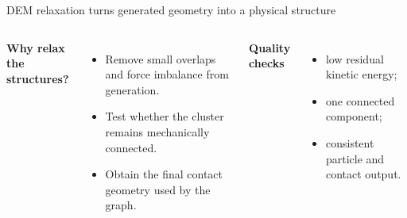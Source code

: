 \documentclass[aspectratio=169,11pt]{beamer}
\newcommand{\hi}[1]{\textcolor{tumblue}{\textbf{#1}}}
\begin{document}
\begin{frame}{DEM relaxation turns generated geometry into a physical structure}
  \begin{columns}[c,onlytextwidth]
    \centering
      \hi{Why relax the structures?}
      \begin{itemize}
        \item Remove small overlaps and force imbalance from generation.
        \item Test whether the cluster remains mechanically connected.
        \item Obtain the final contact geometry used by the graph.
      \end{itemize}
      \vspace{.2cm}
      \hi{Quality checks}
      \begin{itemize}
        \item low residual kinetic energy;
        \item one connected component;
        \item consistent particle and contact output.
      \end{itemize}
  \end{columns}
\end{frame}
\end{document}
